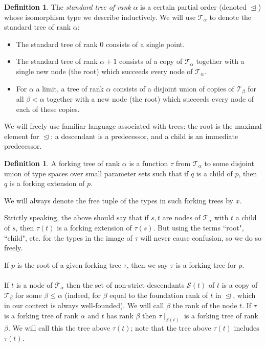 \documentclass{article}
\theoremstyle{remark}
\theoremstyle{definition}
\newtheorem{definition}[theorem]{Definition}
\begin{document}
\begin{definition}
    The \textit{standard tree of rank} $\alpha$ is a certain partial order (denoted $\trianglelefteq$) whose isomorphism type we describe inductively. We will use $\mathcal{T}_\alpha$ to denote the standard tree of rank $\alpha$:

    \begin{itemize}
        \item The standard tree of rank 0 consists of a single point.

        \item The standard tree of rank $\alpha+1$ consists of a copy of $\mathcal{T}_\alpha$ together with a single new node (the root) which succeeds every node of $\mathcal{T}_\alpha$.

        \item For $\alpha$ a limit, a tree of rank $\alpha$ consists of a disjoint union of copies of $\mathcal{T}_\beta$ for all $\beta<\alpha$ together with a new node (the root) which succeeds every node of each of these copies.
    \end{itemize}
\end{definition}
We will freely use familiar language associated with trees: the root is the maximal element for $\trianglelefteq$; a descendant is a predecessor, and a child is an immediate predecessor.

\begin{definition}
    A forking tree of rank $\alpha$ is a function $\tau$ from $\mathcal{T}_\alpha$ to some disjoint union of type spaces over small parameter sets such that if $q$ is a child of $p$, then $q$ is a forking extension of $p$.

    We will always denote the free tuple of the types in such forking trees by $x$.
\end{definition}

Strictly speaking, the above should say that if $s,t$ are nodes of $\mathcal{T}_\alpha$ with $t$ a child of $s$, then $\tau(t)$ is a forking extension of $\tau(s)$. But using the terms ``root", ``child", etc. for the types in the image of $\tau$ will never cause confusion, so we do so freely.

\noindent If $p$ is the root of a given forking tree $\tau$, then we say $\tau$ is a forking tree for $p$.
\\\\
\noindent If $t$ is a node of $\mathcal{T}_\alpha$ then the set of non-strict descendants $\mathcal{S}(t)$ of $t$ is a copy of $\mathcal{T}_\beta$ for some $\beta\leq \alpha$ (indeed, for $\beta$ equal to the foundation rank of $t$ in $\trianglelefteq$, which in our context is always well-founded). We will call $\beta$ the rank of the node $t$. If $\tau$ is a forking tree of rank $\alpha$ and $t$ has rank $\beta$ then $\tau\mid_{\mathcal{S}(t)}$ is a forking tree of rank $\beta$. We will call this the tree above $\tau(t)$; note that the tree above $\tau(t)$ includes $\tau(t)$.
\end{document}
